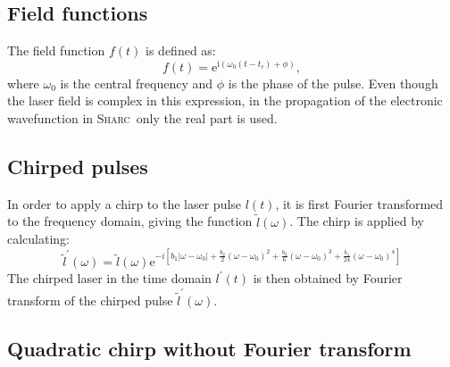 \documentclass[a4paper,11pt,DIV=15,openany,twoside=false]{scrbook}
\newcommand{\sharc}{\textsc{Sharc}}
\newcommand{\E}{\ensuremath{\mathrm{e}}}
\newcommand{\I}{\ensuremath{\mathrm{i}}}
\begin{document}
\subsection{Field functions}

The field function $f(t)$ is defined as:
\begin{equation}
  f(t)=\E^{\I \left(\omega_0(t-t_c)+\phi\right)},
\end{equation}
where $\omega_0$ is the central frequency and $\phi$ is the phase of the pulse. Even though the laser field is complex in this expression, in the propagation of the electronic wavefunction in \sharc\ only the real part is used.

\subsection{Chirped pulses}

In order to apply a chirp to the laser pulse $l(t)$, it is first Fourier transformed to the frequency domain, giving the function $\tilde{l}(\omega)$. The chirp is applied by calculating:
\begin{equation}
  \tilde{l}^\prime(\omega)=
  \tilde{l}(\omega)
  \E^{-i\left[
  b_1|\omega-\omega_0|
  +\frac{b_2}{2}(\omega-\omega_0)^2
  +\frac{b_3}{6}(\omega-\omega_0)^3
  +\frac{b_4}{24}(\omega-\omega_0)^4
  \right]}\label{eq:laser_chirp}
\end{equation}
The chirped laser in the time domain $l^\prime(t)$ is then obtained by Fourier transform of the chirped pulse $\tilde{l}^\prime(\omega)$.


\subsection{Quadratic chirp without Fourier transform}
\end{document}
